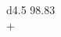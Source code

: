 \documentclass[border = 1mm]{standalone}
\begin{document}
    
\begin{tabular}{d{4.5}}
    98.83 \\
    + \\
    \hline
     \\
    \hline\\
\end{tabular}
\end{document}
